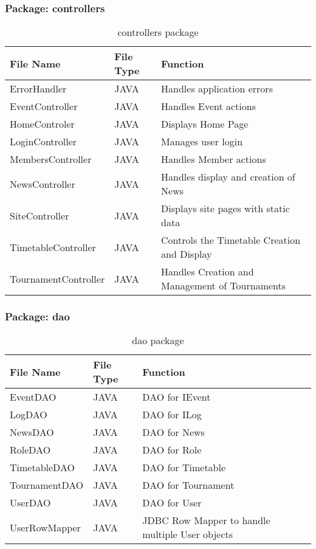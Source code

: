 \subsubsection{Package: controllers}
\begin{table}[H]
\begin{center}
    \begin{tabular}{| l | l | p{5cm} |}
    \hline
    File Name & File Type & Function\\ \hline
    ErrorHandler & JAVA & Handles application errors \\ \hline
	EventController & JAVA & Handles Event actions \\ \hline
	HomeControler & JAVA & Displays Home Page \\ \hline
	LoginController & JAVA & Manages user login \\ \hline
	MembersController & JAVA & Handles Member actions \\ \hline
	NewsController & JAVA & Handles display and creation of News \\ \hline
	SiteController & JAVA & Displays site pages with static data \\ \hline
	TimetableController & JAVA & Controls the Timetable Creation and Display \\ \hline
	TournamentController & JAVA & Handles Creation and Management of Tournaments \\ \hline
    \end{tabular}
\end{center}
\caption{controllers package}
\end{table}

\subsubsection{Package: dao}
\begin{table}[H]
\begin{center}
    \begin{tabular}{| l | l | p{5cm} |}
    \hline
    File Name & File Type & Function\\ \hline
    EventDAO & JAVA & DAO for IEvent\\ \hline
	LogDAO & JAVA & DAO for ILog\\ \hline
	NewsDAO & JAVA & DAO for News\\ \hline
	RoleDAO & JAVA & DAO for Role\\ \hline
	TimetableDAO & JAVA & DAO for Timetable\\ \hline
	TournamentDAO & JAVA & DAO for Tournament\\ \hline
	UserDAO & JAVA & DAO for User\\ \hline
	UserRowMapper & JAVA & JDBC Row Mapper to handle multiple User objects \\ \hline	
    \end{tabular}
\end{center}
\caption{dao package}
\end{table}


